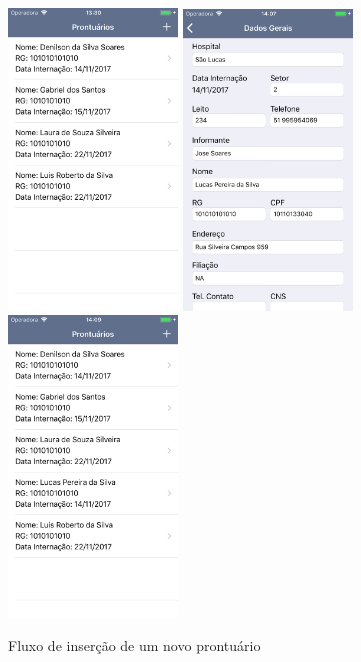 \documentclass[portuguese,oneside]{tcc}
\begin{document}
\begin{figure}[tb]
\begin{center}
\caption{Fluxo de inserção de um novo prontuário}
   \includegraphics[width=4.5cm,frame]{prontuarios}\quad
   \includegraphics[height=8cm,frame]{dados-gerais}\quad
   \includegraphics[height=8cm,frame]{prontuarios-2}
 \label{prontuarios}
\end{center}
\end{figure}
\end{document}
